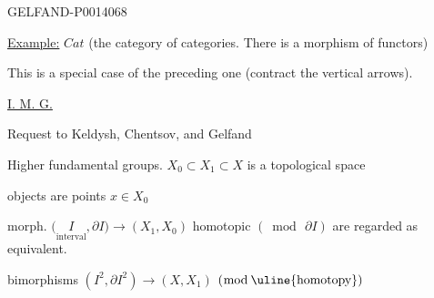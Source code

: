 \begin{GelfandAdjacentEvidence}{GELFAND-P001406}{8}


\uline{Example:} \(Cat\) (the category of categories. There is a morphism of functors)

This is a special case of the preceding one (contract the vertical arrows).

\uline{I. M. G.}

\end{GelfandAdjacentEvidence}


Request to Keldysh, Chentsov, and Gelfand

 Higher fundamental groups.
\(X_0\subset X_1\subset X\) is a topological space

objects are points \(x\in X_0\)

morph.
\(\bigl(\underset{\text{interval}}{I},\partial I\bigr)
\longrightarrow(X_1,X_0)\)
\qquad homotopic \((\bmod\,\partial I)\) are regarded as equivalent.

bimorphisms
\((I^2,\partial I^2)\longrightarrow(X,X_1)\)
\qquad \((\bmod\,\text{\uline{homotopy}})\)


